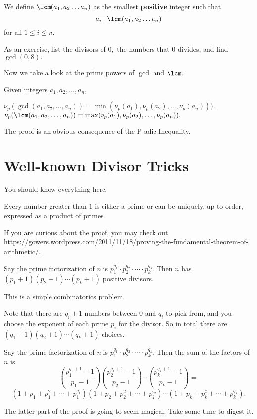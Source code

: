 \documentclass[blue,onecol]{shooting}
\begin{document}
\begin{defi}We define $\lcm(a_1,a_2\dots a_n)$ as the smallest \textbf{positive} integer such that \[a_i\mid \lcm(a_1,a_2\dots a_n)\] for all $1\leq i\leq n.$\end{defi}
As an exercise, list the divisors of $0,$ the numbers that $0$ divides, and find $\gcd(0,8).$

Now we take a look at the prime powers of $\gcd$ and $\lcm.$
\begin{fact}
Given integers $a_1,a_2,\ldots,a_n,$
\begin{itemize}
\Item $\nu_p(\gcd(a_1,a_2,\ldots,a_n))=\min(\nu_p(a_1),\nu_p(a_2),\ldots,\nu_p(a_n))).$
\Item $\nu_p(\lcm(a_1,a_2,\ldots,a_n))=\max(\nu_p(a_1),\nu_p(a_2),\ldots,\nu_p(a_n)).$
\end{itemize}
\end{fact}

The proof is an obvious consequence of the P-adic Inequality.

\section{Well-known Divisor Tricks}
You should know everything here.

\begin{theo}
Every number greater than $1$ is either a prime or can be uniquely, up to order, expressed as a product of primes.
\end{theo}

If you are curious about the proof, you may check out \url{https://gowers.wordpress.com/2011/11/18/proving-the-fundamental-theorem-of-arithmetic/}.

\begin{theo}
Say the prime factorization of $n$ is $p_1^{q_1}\cdot p_2^{q_2}\cdot\cdots\cdot p_k^{q_k}.$ Then $n$ has $(p_1+1)(p_2+1)\cdots(p_k+1)$ positive divisors.
\end{theo}

\begin{pro}
This is a simple combinatorics problem.

Note that there are $q_i+1$ numbers between $0$ and $q_i$ to pick from, and you choose the exponent of each prime $p_i$ for the divisor. So in total there are $(q_1+1)(q_2+1)\cdots(q_k+1)$ choices.
\end{pro}

\begin{theo}
Say the prime factorization of $n$ is $p_1^{q_1}\cdot p_2^{q_2}\cdot\cdots\cdot p_k^{q_k}.$ Then the sum of the factors of $n$ is
\[\left(\frac{p_1^{q_1+1}-1}{p_1-1}\right)\left(\frac{p_2^{q_1+1}-1}{p_2-1}\right)\cdots\left(\frac{p_k^{q_k+1}-1}{p_k-1}\right)=\]
\[\left(1+p_1+p_1^2+\cdots+p_1^{q_1}\right)\left(1+p_2+p_2^2+\cdots+p_2^{q_2}\right)\cdots\left(1+p_k+p_k^2+\cdots+p_k^{q_k}\right).\]
\end{theo}
The latter part of the proof is going to seem magical. Take some time to digest it.
\end{document}
